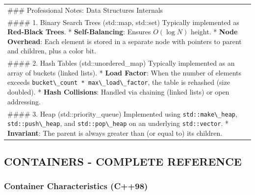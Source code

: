 \begin{longtable}[]{@{}
  >{\raggedright\arraybackslash}p{}@{}}
\toprule
\endhead
\#\#\# Professional Notes: Data Structures Internals \\
\#\#\#\# 1. Binary Search Trees (std::map, std::set) Typically
implemented as \textbf{Red-Black Trees}. * \textbf{Self-Balancing}:
Ensures \(O(\log N)\) height. * \textbf{Node Overhead}: Each element is
stored in a separate node with pointers to parent and children, plus a
color bit. \\
\#\#\#\# 2. Hash Tables (std::unordered\_map) Typically implemented as
an array of buckets (linked lists). * \textbf{Load Factor}: When the
number of elements exceeds
\passthrough{\lstinline!bucket\_count * max\_load\_factor!}, the table
is rehashed (size doubled). * \textbf{Hash Collisions}: Handled via
chaining (linked lists) or open addressing. \\
\#\#\#\# 3. Heap (std::priority\_queue) Implemented using
\passthrough{\lstinline!std::make\_heap!},
\passthrough{\lstinline!std::push\_heap!}, and
\passthrough{\lstinline!std::pop\_heap!} on an underlying
\passthrough{\lstinline!std::vector!}. * \textbf{Invariant}: The parent
is always greater than (or equal to) its children. \\
\bottomrule
\end{longtable}

\hypertarget{containers---complete-reference}{%
\subsection{CONTAINERS - COMPLETE
REFERENCE}\label{containers---complete-reference}}

\hypertarget{container-characteristics-c98}{%
\subsubsection{Container Characteristics
(C++98)}\label{container-characteristics-c98}}

